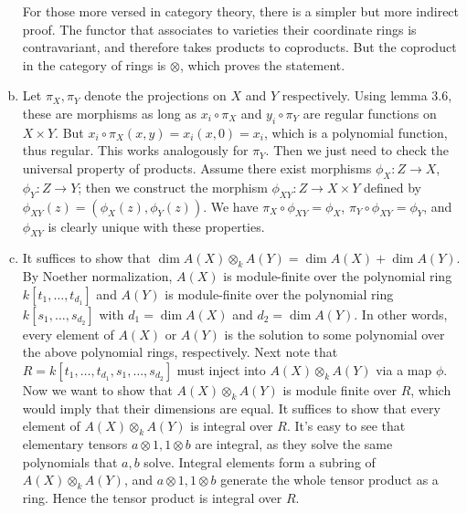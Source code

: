 \documentclass{mathnotes}
\begin{document}
\begin{enumerate}[(a)]
For those more versed in category theory, there is a simpler but more indirect proof. The functor that associates to varieties their coordinate rings is contravariant, and therefore takes products to coproducts. But the coproduct in the category of rings is $\otimes$, which proves the statement.
    \item Let $\pi_X, \pi_Y$ denote the projections on $X$ and $Y$ respectively. Using lemma 3.6, these are morphisms as long as $x_i \circ \pi_X$ and $y_i \circ \pi_Y$ are regular functions on $X \times Y$. But $x_i \circ \pi_X (x, y) = x_i (x, 0) = x_i$, which is a polynomial function, thus regular. This works analogously for $\pi_Y$. Then we just need to check the universal property of products. Assume there exist morphisms $\phi_X :Z \to X$, $\phi_Y : Z \to Y$; then we construct the morphism $\phi_{XY} : Z \to X \times Y$ defined by $\phi_{XY} (z) = (\phi_X (z) , \phi_Y(z))$. We have $\pi_X \circ \phi_{XY} = \phi_X$, $\pi_Y \circ \phi_{XY} = \phi_Y$, and $\phi_{XY}$ is clearly unique with these properties.
    \item It suffices to show that $\dim A(X)\otimes_k A(Y)=\dim A(X)+\dim A(Y)$. By Noether
        normalization, $A(X)$ is module-finite over the polynomial ring $k[t_1,\ldots,t_{d_1}]$
        and $A(Y)$ is module-finite over the polynomial ring $k[s_1,\ldots,s_{d_2}]$ with
        $d_1=\dim A(X)$ and $d_2=\dim A(Y)$. In other words, every element of $A(X)$ or $A(Y)$
        is the solution to some polynomial over the above polynomial rings, respectively.
        Next note that $R=k[t_1,\ldots,t_{d_1}, s_1,\ldots,s_{d_2}]$ must inject into
        $A(X)\otimes_kA(Y)$ via a map $\phi$. 
	Now we want to show that $A(X) \otimes_k A(Y)$ is module finite over $R$, which would imply
	that their dimensions are equal. It suffices to show that every element of $A(X) \otimes_k A(Y)$
	is integral over $R$. It's easy to see that elementary tensors $a\otimes 1, 1\otimes b$ are integral,
	as they solve the same polynomials that $a, b$ solve. Integral elements form a subring 
	of $A(X) \otimes_k A(Y)$, and $a\otimes 1, 1\otimes b$ generate the whole tensor product as a ring.
        Hence the tensor product is integral over $R$.
\end{enumerate}
\end{document}
